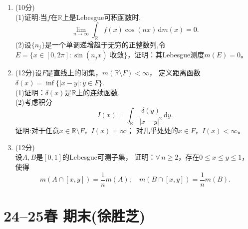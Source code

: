 \begin{enumerate}
\item (10分)\\
(1)证明:当$f$在$\mathbb{R}$上是Lebesgue可积函数时,
\[\lim_{n \rightarrow \infty} \int_{\mathbb{R}}f(x)\cos(nx)\,\mathrm{d}m(x)=0.\]
(2)设$\{n_{j}\}$是一个单调递增趋于无穷的正整数列,令$E=\{x\in [0,2\pi]:\sin(n_{j}x)\text{ 收敛}\}$，证明：其Lebesgue测度$m(E)=0$。

\item (12分)设$F$是直线上的闭集，$m(\mathbb{R} \setminus F) < \infty$，
定义距离函数$\delta(x)=\inf\{|x-y|:y\in F\}$.\\
(1)证明：$\delta(x)$是$\mathbb{R}$上的连续函数.\\
(2)考虑积分
\[I(x)=\int_{\mathbb{R}}\frac{\delta(y)}{|x-y|^{2}}\,\mathrm{d}y.\]
证明:对于任意$ x\in \mathbb{R} \setminus F$，$I(x)=\infty$；
对几乎处处的$x \in F$，$I(x) < \infty$。

\item (12分)\\
设$A,B$是$[0,1]$的Lebesgue可测子集，
证明：$\forall \, n \geq 2$，存在$0\leq x \leq y \leq1$，使得
\[m(A\cap[x,y])=\frac{1}{n}m(A); \quad m(B\cap[x,y])=\frac{1}{n}m(B).\]
\end{enumerate}

\section{24--25春 期末(徐胜芝)}

